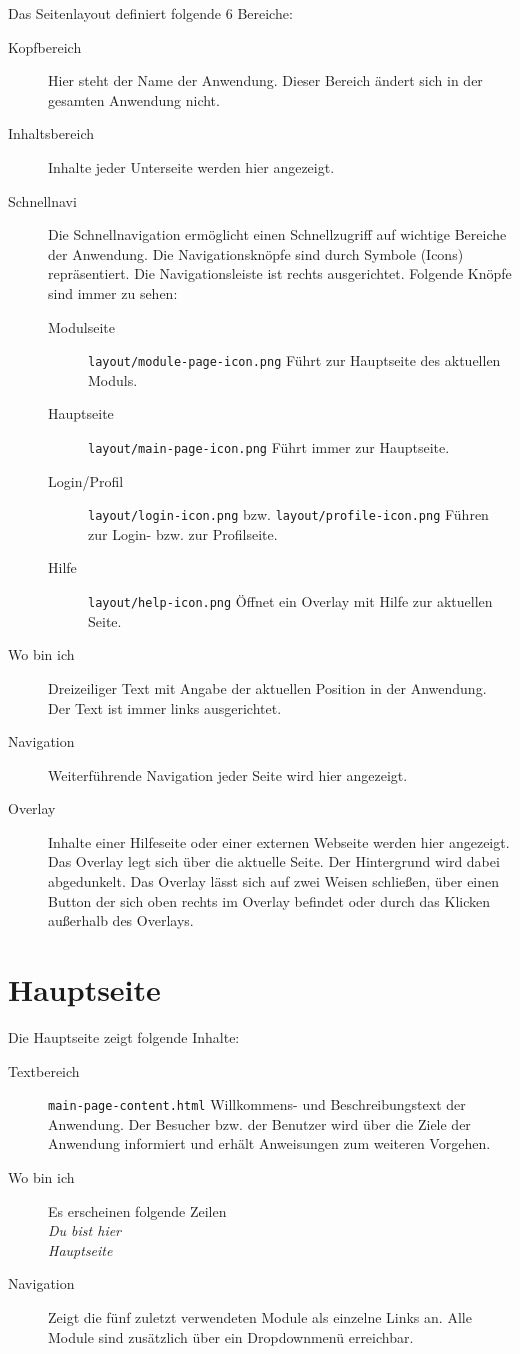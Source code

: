 Das Seitenlayout definiert folgende 6 Bereiche:
\begin{description}
  \item[Kopfbereich] Hier steht der Name der Anwendung. Dieser Bereich ändert sich in der gesamten Anwendung nicht.
  \item[Inhaltsbereich] Inhalte jeder Unterseite werden hier angezeigt.
  \item[Schnellnavi] Die Schnellnavigation ermöglicht einen Schnellzugriff auf wichtige Bereiche der Anwendung. Die Navigationsknöpfe sind durch Symbole (Icons) repräsentiert. Die Navigationsleiste ist rechts ausgerichtet. Folgende Knöpfe sind immer zu sehen:
  \begin{description}
    \item[Modulseite] \texttt{layout/module-page-icon.png} Führt zur Hauptseite des aktuellen Moduls. 
    \item[Hauptseite] \texttt{layout/main-page-icon.png} Führt immer zur Hauptseite. 
    \item[Login/Profil] \texttt{layout/login-icon.png} bzw. \texttt{layout/profile-icon.png} Führen zur Login- bzw. zur Profilseite. 
    \item[Hilfe] \texttt{layout/help-icon.png} Öffnet ein Overlay mit Hilfe zur aktuellen Seite. 
  \end{description}
  
  \item[Wo bin ich] Dreizeiliger Text mit Angabe der aktuellen Position in der Anwendung. Der Text ist immer links ausgerichtet.
  \item[Navigation] Weiterführende Navigation jeder Seite wird hier angezeigt.
  \item[Overlay] Inhalte einer Hilfeseite oder einer externen Webseite werden hier angezeigt.
	Das Overlay legt sich über die aktuelle Seite. Der Hintergrund wird dabei abgedunkelt. 
	Das Overlay lässt sich auf zwei Weisen schließen, über einen Button der sich oben rechts im Overlay befindet oder durch das Klicken außerhalb des Overlays.
\end{description}


%
%
%
\section{Hauptseite}
\label{sec:main-page}

Die Hauptseite zeigt folgende Inhalte:
\begin{description}
  \item[Textbereich] \texttt{main-page-content.html} Willkommens- und Beschreibungstext der Anwendung. Der Besucher bzw. der Benutzer wird über die Ziele der Anwendung informiert und erhält Anweisungen zum weiteren Vorgehen.
  \item[Wo bin ich] Es erscheinen folgende Zeilen \emph{\\Du bist hier \\Hauptseite}
  \item[Navigation] Zeigt die fünf zuletzt verwendeten Module als einzelne Links an. Alle Module sind zusätzlich über ein Dropdownmenü erreichbar.
	
\end{description}




